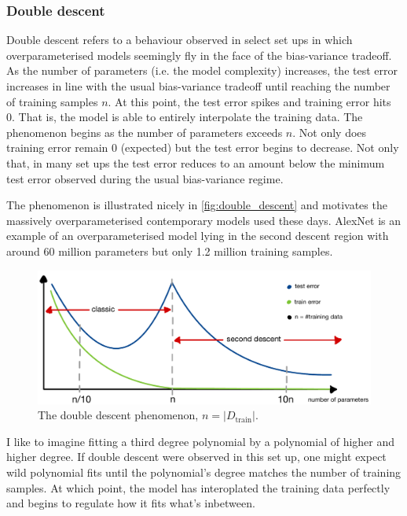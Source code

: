 \documentclass[11pt]{article}
\begin{document}
\subsubsection{Double descent}
Double descent refers to a behaviour observed in select set ups in which overparameterised models seemingly fly in the face of the bias-variance tradeoff. As the number of parameters (i.e. the model complexity) increases, the test error increases in line with the usual bias-variance tradeoff until reaching the number of training samples $n$. At this point, the test error spikes and training error hits 0. That is, the model is able to entirely interpolate the training data. The phenomenon begins as the number of parameters exceeds $n$. Not only does training error remain 0 (expected) but the test error begins to decrease. Not only that, in many set ups the test error reduces to an amount below the minimum test error observed during the usual bias-variance regime.

The phenomenon is illustrated nicely in \autoref{fig:double_descent} and motivates the massively overparameterised contemporary models used these days. AlexNet is an example of an overparameterised model lying in the second descent region with around 60 million parameters but only 1.2 million training samples.

\begin{figure}[t]
    \centering
    \includegraphics[width=1\columnwidth]{./figures/supervised_learning/double_descent.pdf}
    \caption{The double descent phenomenon, $n=|D_{\text{train}}|$.}
    \label{fig:double_descent}
\end{figure}

I like to imagine fitting a third degree polynomial by a polynomial of higher and higher degree. If double descent were observed in this set up, one might expect wild polynomial fits until the polynomial's degree matches the number of training samples. At which point, the model has interoplated the training data perfectly and begins to regulate how it fits what's inbetween.
\end{document}
